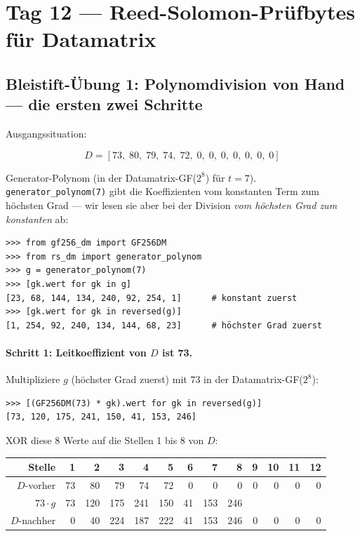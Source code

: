 \section*{Tag 12 — Reed-Solomon-Prüfbytes für Datamatrix}

\subsection*{Bleistift-Übung 1: Polynomdivision von Hand — die ersten zwei Schritte}

Ausgangssituation:

\[
  D = [73,\; 80,\; 79,\; 74,\; 72,\; 0,\; 0,\; 0,\; 0,\; 0,\; 0,\; 0]
\]

Generator-Polynom (in der Datamatrix-GF($2^8$) für $t = 7$).
\texttt{generator\_polynom(7)} gibt die Koeffizienten vom konstanten
Term zum höchsten Grad — wir lesen sie aber bei der Division
\emph{vom höchsten Grad zum konstanten} ab:

\begin{verbatim}
>>> from gf256_dm import GF256DM
>>> from rs_dm import generator_polynom
>>> g = generator_polynom(7)
>>> [gk.wert for gk in g]
[23, 68, 144, 134, 240, 92, 254, 1]      # konstant zuerst
>>> [gk.wert for gk in reversed(g)]
[1, 254, 92, 240, 134, 144, 68, 23]      # höchster Grad zuerst
\end{verbatim}

\paragraph{Schritt 1: Leitkoeffizient von $D$ ist 73.}
Multipliziere $g$ (höchster Grad zuerst) mit $73$ in der
Datamatrix-GF($2^8$):

\begin{verbatim}
>>> [(GF256DM(73) * gk).wert for gk in reversed(g)]
[73, 120, 175, 241, 150, 41, 153, 246]
\end{verbatim}

XOR diese 8 Werte auf die Stellen 1 bis 8 von $D$:

\begin{center}
\small
\begin{tabular}{r r r r r r r r r r r r r}
\toprule
Stelle & 1 & 2 & 3 & 4 & 5 & 6 & 7 & 8 & 9 & 10 & 11 & 12 \\
\midrule
$D$-vorher  &  73 &  80 &  79 &  74 &  72 &   0 &   0 &   0 &   0 &   0 &   0 &   0 \\
$73 \cdot g$ &  73 & 120 & 175 & 241 & 150 &  41 & 153 & 246 &     &     &     &     \\
$D$-nachher &   0 &  40 & 224 & 187 & 222 &  41 & 153 & 246 &   0 &   0 &   0 &   0 \\
\bottomrule
\end{tabular}
\end{center}

